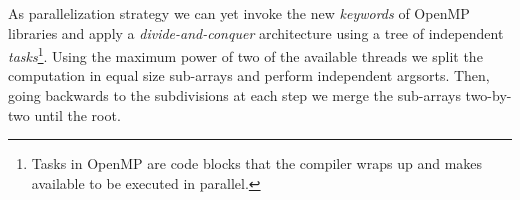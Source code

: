 \documentclass{standalone}
\begin{document}
As parallelization strategy we can yet invoke the new \emph{keywords} of OpenMP libraries and apply a \emph{divide-and-conquer} architecture using a tree of independent \emph{tasks}\footnote{
  Tasks in OpenMP are code blocks that the compiler wraps up and makes available to be executed in parallel.
}.
Using the maximum power of two of the available threads we split the computation in equal size sub-arrays and perform independent \textsf{argsort}s.
Then, going backwards to the subdivisions at each step we merge the sub-arrays two-by-two until the root.
\end{document}
